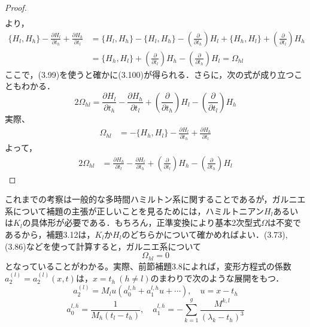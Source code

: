 \begin{story}
\begin{proof}
\begin{align*}
\end{align*}
より，
\begin{align*}
    \lbrace H_l, H_h \rbrace - \frac{\partial H_l}{\partial t_h} + \frac{\partial H_h}{\partial t_l} &= \lbrace H_l, H_h \rbrace - \lbrace H_l, H_h \rbrace - \left( \frac{\partial}{\partial t_h} \right) H_l + \lbrace H_h, H_l \rbrace + \left( \frac{\partial}{\partial t_l} \right) H_h \\
    &= \lbrace H_h, H_l \rbrace + \left( \frac{\partial}{\partial t_l} \right) H_h - \left( \frac{\partial}{\partial t_h} \right) H_l = \Omega_{hl}
\end{align*}
ここで，(3.99)を使うと確かに(3.100)が得られる．さらに，次の式が成り立つこともわかる．
\begin{equation}
    2\Omega_{hl} = \frac{\partial H_l}{\partial t_h} - \frac{\partial H_h}{\partial t_l} + \left( \frac{\partial}{\partial t_h} \right) H_l - \left( \frac{\partial}{\partial t_l} \right) H_h \tag{3.102}
\end{equation}
実際、
\begin{align*}
    \Omega_{hl} &= - \lbrace H_h, H_l \rbrace - \frac{\partial H_l}{\partial t_h} + \frac{\partial H_h}{\partial t_l}
\end{align*}
よって，
\begin{align*}
    2\Omega_{hl} &= \frac{\partial H_h}{\partial t_l} - \frac{\partial H_l}{\partial t_h} + \left( \frac{\partial}{\partial t_l} \right) H_h - \left( \frac{\partial}{\partial t_h} \right) H_l
\end{align*}
\end{proof}

これまでの考察は一般的な多時間ハミルトン系に関することであるが，ガルニエ系について補題の主張が正しいことを見るためには，ハミルトニアン$H_l$あるいは$K_l$の具体形が必要である．もちろん，正準変換により基本2次型式$\Omega$は不変であるから，補題3.12は，$K_l$か$H_l$のどちらかについて確かめればよい．(3.73), (3.86)などを使って計算すると，ガルニエ系について
\begin{equation*}
    \Omega_{hl} = 0
\end{equation*}
となっていることがわかる。実際、前節補題3.8によれば，変形方程式の係数$a_2^{(l)} = a_2^{(l)}(x,t)$は，$x=t_h \ (h \neq l)$のまわりで次のような展開をもつ．
\begin{equation*}
    a_2^{(l)} = M_l u(a_0^{l,h} + a_1^{l,h}u + \cdots), \quad u = x - t_h
\end{equation*}
\begin{equation*}
    a_0^{l,h} = \frac{1}{M_h(t_l - t_h)}, \quad a_1^{l,h} = - \sum_{k=1}^g \frac{M^{k,l}}{(\lambda_k - t_h)^3}
\end{equation*}
\end{story}
